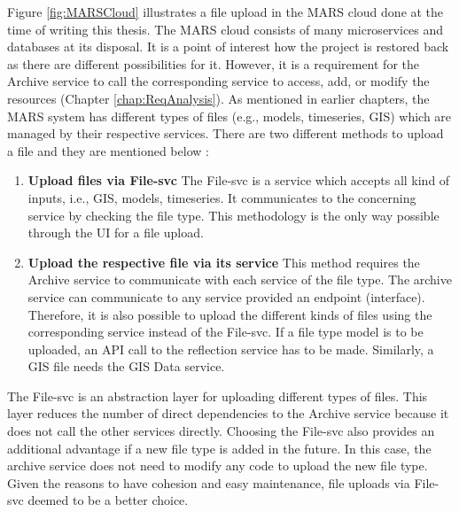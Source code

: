 Figure \ref{fig:MARSCloud} illustrates a file upload in the MARS cloud done at the time of writing this thesis. 
The MARS cloud consists of many 
microservices and databases at its disposal. It is a point of interest how the project is restored back as there are different possibilities for it. 
However, it is a requirement for the Archive service
to call the corresponding service to access, add, or modify the resources (Chapter \ref{chap:ReqAnalysis}). As mentioned in earlier chapters, the MARS system
has different types of files (e.g., models, timeseries, GIS) which are managed by their respective services. There are two different methods to upload a file 
and they are mentioned below :
\begin{enumerate}
 \item \textbf{Upload files via File-svc} The File-svc is a service which accepts all kind of inputs, i.e., GIS, models, timeseries. It communicates to the
 concerning service by checking the file type. This methodology is the only way possible through the UI for a file upload.   
 \item \textbf{Upload the respective file via its service} This method requires the Archive service to communicate with each service of the file type. 
The archive service can communicate to any service provided an endpoint (interface). Therefore, it is also possible to upload the different kinds of files using the
corresponding service instead of the File-svc. If a file type model is to be uploaded, an API call to the reflection service has to be made. Similarly, a GIS
file needs the GIS Data service.
\end{enumerate} 

The File-svc is an abstraction layer for uploading different types of files. This layer reduces the number of direct dependencies to the Archive
service because it does not call the other services directly. Choosing the File-svc also provides an additional advantage if a new file type is added in the future.
In this case, the archive service does not need to modify any code to upload the new file type. Given the reasons to have cohesion and easy maintenance, file uploads
via File-svc deemed to be a better choice. 

